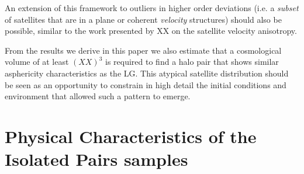 \documentclass[a4paper,fleqn,usenatbib]{mnras}
\begin{document}
An extension of this framework to outliers in higher order deviations
(i.e. a \emph{subset} of satellites that are in a plane or
coherent \emph{velocity} structures) should also be possible, similar
to the work presented by XX\cite{2013Natur.493...62I} on the satellite velocity anisotropy.

From the results we derive in this paper we also estimate that a
cosmological volume of at least $( XX )^3$ is required to find a halo pair
that shows similar asphericity characteristics as the LG. 
This atypical satellite distribution should be seen as an opportunity
to constrain in high detail the initial conditions and environment
that allowed such a pattern to emerge. 










\appendix

\section{Physical Characteristics of the Isolated Pairs samples}
\end{document}
